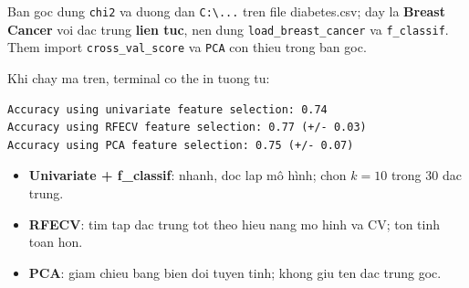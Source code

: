 \begin{luuy}[title={Sua loi so voi ban goc Tutorialspoint}]
Ban goc dung \texttt{chi2} va duong dan \texttt{C:\textbackslash...} tren file diabetes.csv; day la \textbf{Breast Cancer} voi dac trung \textbf{lien tuc}, nen dung \texttt{load\_breast\_cancer} va \texttt{f\_classif}. Them import \texttt{cross\_val\_score} va \texttt{PCA} con thieu trong ban goc.
\end{luuy}

\begin{vidu}[title={Ket qua chay (tham khao)}]
Khi chay ma tren, terminal co the in tuong tu:
\begin{lstlisting}
Accuracy using univariate feature selection: 0.74
Accuracy using RFECV feature selection: 0.77 (+/- 0.03)
Accuracy using PCA feature selection: 0.75 (+/- 0.07)
\end{lstlisting}
\end{vidu}

\begin{tinhchat}[title={So sanh nhanh ba cach trong vi du}]
\begin{itemize}
  \item \textbf{Univariate + f\_classif}: nhanh, doc lap mô hình; chon $k=10$ trong 30 dac trung.
  \item \textbf{RFECV}: tim tap dac trung tot theo hieu nang mo hinh va CV; ton tinh toan hon.
  \item \textbf{PCA}: giam chieu bang bien doi tuyen tinh; khong giu ten dac trung goc.
\end{itemize}
\end{tinhchat}
